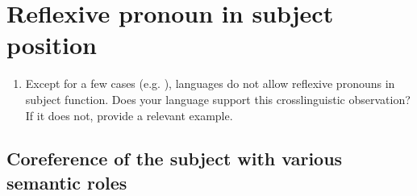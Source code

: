 \documentclass[output=paper]{langscibook}
\begin{document}
\section*{Reflexive pronoun in subject position}
\begin{enumerate}[resume]
\item
Except for a few cases (e.g. ), languages do not allow reflexive pronouns in subject function. Does your language support this crosslinguistic observation? If it does not, provide a relevant example. 

\end{enumerate}


\subsection*{Coreference of the subject with various semantic roles}
\end{document}
